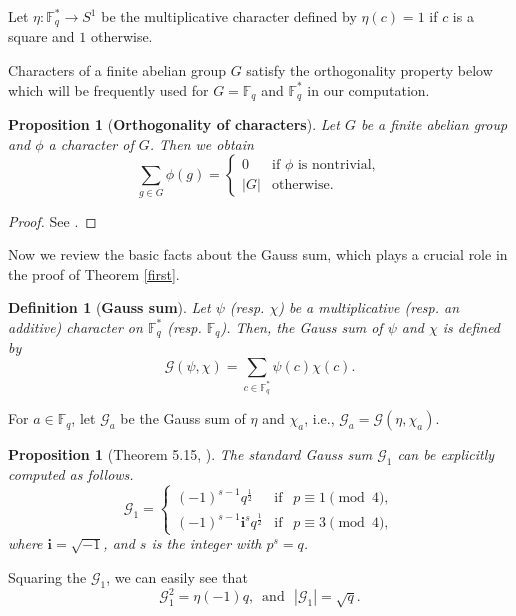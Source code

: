 \documentclass[a4paper,11pt]{amsart}
\numberwithin{equation}{section}
\newtheorem{proposition}[theorem]{Proposition}
\newtheorem{definition}[theorem]{Definition}
\def\Fq#1{\mathbb{F}_q^{#1}}
\def\CG{\mathcal{G}_1}
\begin{document}
Let $\eta:\Fq{*}\rightarrow S^1$ be the multiplicative character defined by
$\eta(c)= 1$ if $c$ is a square and $1$ otherwise. 

Characters of a finite abelian group $G$ satisfy the  orthogonality property below which will be frequently used  for $G=\mathbb F_q $ and $\mathbb F_q^*$ in our computation. 
\begin{proposition}[\textbf{Orthogonality of characters}]
\label{Orthogonality}
Let $G$ be a finite abelian group and $\phi$ a character of $G$. Then we obtain
\[
\sum_{g \in G} \phi(g) =
\begin{cases}
0 & \text{if } \phi \text{ is nontrivial}, \\
|G| & \text{otherwise}.
\end{cases}
\]\end{proposition}

\begin{proof}
See  \cite[Example 5.10]{LN97}.
\end{proof}



Now we review the basic facts about the Gauss sum, which plays a crucial role in the proof of Theorem \ref{first}.

\begin{definition}[\textbf{Gauss sum}]\label{GaussSumDf}
Let $\psi$ (resp. $\chi$)  be a multiplicative (resp.  an additive) character on $\mathbb{F}_q^*$ (resp. $\Fq{}$). Then, the Gauss sum of $\psi$ and $\chi$ is defined by
\begin{equation}
 \label{Gs}
 \mathcal{G}(\psi, \chi) = \sum_{c \in \mathbb{F}_q^*} \psi(c)\chi(c).
\end{equation}
\end{definition}
For $a \in \mathbb{F}_q$, let $\mathcal{G}_a$ be the Gauss sum of $\eta$ and $\chi_a$, i.e., $\mathcal{G}_a = \mathcal{G}(\eta, \chi_a)$.

\begin{proposition}[Theorem 5.15, \cite{LN97}]\label{ExGa} The standard Gauss sum $\mathcal{G}_1$ can be explicitly computed as follows.
\begin{equation}
 \mathcal{G}_1 =
 \begin{cases}
 (-1)^{s-1}q^{\frac{1}{2}} &\text{if } ~~ p \equiv 1 \pmod 4,\\
 (-1)^{s-1}\mathbf{i}^sq^{\frac{1}{2}} &\text{if }~~ p \equiv 3 \pmod 4,
 \end{cases}
\end{equation}
where $\mathbf{i} = \sqrt{-1}$, and $s$ is the integer with  $p^s = q$.
\end{proposition}
Squaring the $\CG$, we can easily see that
\begin{equation}\label{GSQETA}\mathcal{G}_1^2=\eta(-1)q, \, \, \, \mathrm{and}\, \, \, \, |\mathcal{G}_1|=\sqrt{q}.\end{equation}
\end{document}
